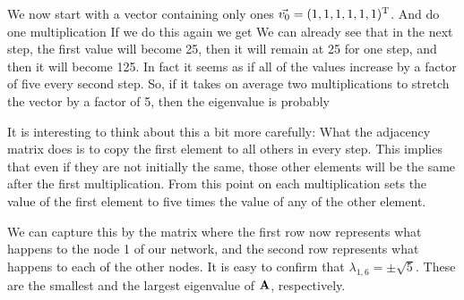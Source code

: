 We now start with a vector containing only ones $\vec{v_0} = (1,1,1,1,1,1)^{\rm T}$. And do one multiplication
If we do this again we get 
We can already see that in the next step, the first value will become 25, then it will remain at 25 for one step, and then it will become 125. In fact it seems as if all of the values increase by a factor of five every second step. So, if it takes on average two multiplications to stretch the vector by a factor of 5, then the eigenvalue is probably 

It is interesting to think about this a bit more carefully: What the adjacency matrix does is to copy the first element to all others in every step. This implies that even if they are not initially the same, those other elements will be the same after the first multiplication. From this point on each multiplication sets the value of the first element to five times the value of any of the other element.

We can capture this by the matrix
where the first row now represents what happens to the node 1 of our network, and the second row represents what happens to each of the other nodes. It is easy to confirm that $\lambda_{1,6} = \pm \sqrt{5}$. These are the smallest and the largest eigenvalue of $\bf A$, respectively.

